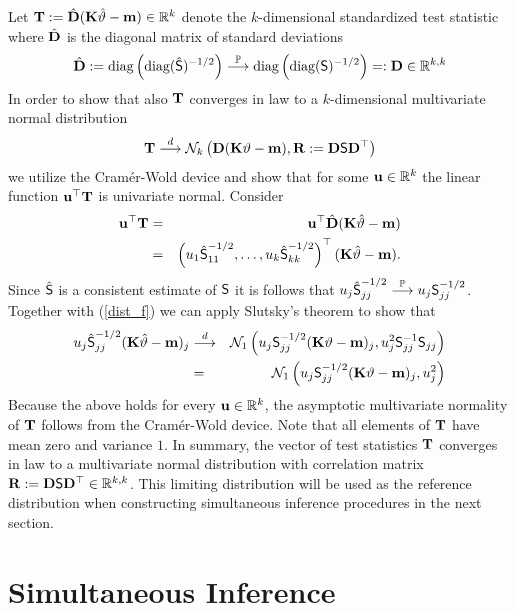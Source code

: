 \documentclass[12pt]{article}
\begin{document}
Let $\T := \hat{\D} (\K \hat{\vartheta} - \m) \in \R^k$ denote
the $k$-dimensional standardized test statistic where $\hat{\D}$ is the diagonal
matrix of standard deviations
\begin{eqnarray*}
\hat{\D} := \text{diag}\left(\text{diag}(\hat{\S})^{-1/2}\right) \cP 
\text{diag}\left(\text{diag}(\S)^{-1/2}\right) =: \D \in \R^{k,k}
\end{eqnarray*}
In order to show that also $\T$ converges in law to a $k$-dimensional multivariate
normal distribution
\begin{eqnarray*}
\T \cL \N_k\left(\D(\K \vartheta - \m), \Cor := \D \S \D^\top\right)
\end{eqnarray*}
we utilize the Cram{\'e}r-Wold device and show that for some $\uu \in \R^k$ 
the linear function $\uu^\top \T$ is univariate normal. Consider
\begin{eqnarray*}
\uu^\top \T & = & \uu^\top \hat{\D} (\K \hat{\vartheta} - \m) \\
& = & \left(u_1 \hat{\S}_{11}^{-1/2}, \dots, u_k \hat{\S}_{kk}^{-1/2}\right)^\top(\K \hat{\vartheta} - \m).
\end{eqnarray*}
Since $\hat{\S}$ is a consistent estimate of $\S$ it 
is follows that $u_j \hat{\S}_{jj}^{-1/2} \cP u_j \S_{jj}^{-1/2}$.
Together with (\ref{dist_f}) we can apply Slutsky's theorem to show that
\begin{eqnarray*}
u_j \hat{\S}_{jj}^{-1/2} (\K \hat{\vartheta} - \m)_j & \cL &  
\N_1\left(u_j \S_{jj}^{-1/2} (\K \vartheta - \m)_j, u_j^2 \S_{jj}^{-1} \S_{jj}\right) \\
& = & \N_1\left(u_j \S_{jj}^{-1/2} (\K \vartheta - \m)_j, u_j^2\right)
\end{eqnarray*}
Because the above holds for every $\uu \in \R^k$, the asymptotic multivariate
normality of $\T$ follows from the Cram{\'e}r-Wold device. Note that
all elements of $\T$ have mean zero and variance $1$. In summary,
the vector of test statistics $\T$ converges in law to a multivariate
normal distribution with correlation matrix 
$\Cor := \D \S \D^\top \in \R^{k,k}$. This limiting distribution
will be used as the reference distribution when constructing
simultaneous inference procedures in the next section.

\section{Simultaneous Inference} \label{siminf}
\end{document}
